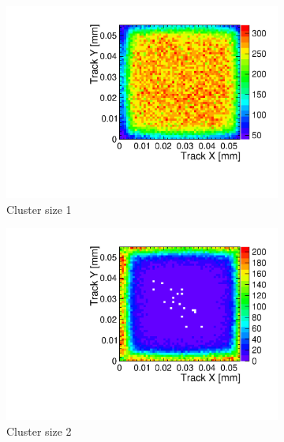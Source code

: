 \begin{figure}[htbp] \centering
  \begin{subfigure}[b]{0.23\textwidth}
    \includegraphics[width=\textwidth]{./figures/TestBeam/TrackPosWPixel_1hit_runW19_G7.pdf}
    \caption{Cluster size 1}
  \end{subfigure} \hfill
  \begin{subfigure}[b]{0.23\textwidth}
    \includegraphics[width=\textwidth]{./figures/TestBeam/TrackPosWPixel_2hit_runW19_G7.pdf}
    \caption{Cluster size 2}
  \end{subfigure} \hfill
  \begin{subfigure}[b]{0.23\textwidth}

\end{subfigure}
\end{figure}
